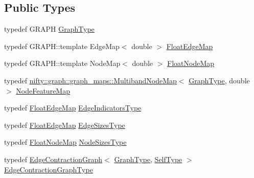 \subsection*{Public Types}
\begin{DoxyCompactItemize}
\item 
typedef G\+R\+A\+PH \hyperlink{classnifty_1_1graph_1_1agglo_1_1NodeAndEdgeWeightedClusterPolicy_a293d476ffc7b8513eeb20c21bfefb579}{Graph\+Type}
\item 
typedef G\+R\+A\+P\+H\+::template Edge\+Map$<$ double $>$ \hyperlink{classnifty_1_1graph_1_1agglo_1_1NodeAndEdgeWeightedClusterPolicy_ad96ecbc93cd5424b2d5dd013439820ca}{Float\+Edge\+Map}
\item 
typedef G\+R\+A\+P\+H\+::template Node\+Map$<$ double $>$ \hyperlink{classnifty_1_1graph_1_1agglo_1_1NodeAndEdgeWeightedClusterPolicy_a0962d8b4fc0f7612af92d81d5a8b1ff6}{Float\+Node\+Map}
\item 
typedef \hyperlink{structnifty_1_1graph_1_1graph__maps_1_1MultibandNodeMap}{nifty\+::graph\+::graph\+\_\+maps\+::\+Multiband\+Node\+Map}$<$ \hyperlink{classnifty_1_1graph_1_1agglo_1_1NodeAndEdgeWeightedClusterPolicy_a293d476ffc7b8513eeb20c21bfefb579}{Graph\+Type}, double $>$ \hyperlink{classnifty_1_1graph_1_1agglo_1_1NodeAndEdgeWeightedClusterPolicy_aa07dae5e9a8be0e547eb7d1e9921dd05}{Node\+Feature\+Map}
\item 
typedef \hyperlink{classnifty_1_1graph_1_1agglo_1_1NodeAndEdgeWeightedClusterPolicy_ad96ecbc93cd5424b2d5dd013439820ca}{Float\+Edge\+Map} \hyperlink{classnifty_1_1graph_1_1agglo_1_1NodeAndEdgeWeightedClusterPolicy_a708c515ae905c01d71d590976fb06ebb}{Edge\+Indicators\+Type}
\item 
typedef \hyperlink{classnifty_1_1graph_1_1agglo_1_1NodeAndEdgeWeightedClusterPolicy_ad96ecbc93cd5424b2d5dd013439820ca}{Float\+Edge\+Map} \hyperlink{classnifty_1_1graph_1_1agglo_1_1NodeAndEdgeWeightedClusterPolicy_a3026f9b9f7061857a7d6c833c1b2fafb}{Edge\+Sizes\+Type}
\item 
typedef \hyperlink{classnifty_1_1graph_1_1agglo_1_1NodeAndEdgeWeightedClusterPolicy_a0962d8b4fc0f7612af92d81d5a8b1ff6}{Float\+Node\+Map} \hyperlink{classnifty_1_1graph_1_1agglo_1_1NodeAndEdgeWeightedClusterPolicy_a47dc2122410c8a113e4b14664be633c7}{Node\+Sizes\+Type}
\item 
typedef \hyperlink{classnifty_1_1graph_1_1EdgeContractionGraph}{Edge\+Contraction\+Graph}$<$ \hyperlink{classnifty_1_1graph_1_1agglo_1_1NodeAndEdgeWeightedClusterPolicy_a293d476ffc7b8513eeb20c21bfefb579}{Graph\+Type}, \hyperlink{classnifty_1_1graph_1_1agglo_1_1NodeAndEdgeWeightedClusterPolicy}{Self\+Type} $>$ \hyperlink{classnifty_1_1graph_1_1agglo_1_1NodeAndEdgeWeightedClusterPolicy_a467e2768e424a998379deedaaebfe9a9}{Edge\+Contraction\+Graph\+Type}
\end{DoxyCompactItemize}
